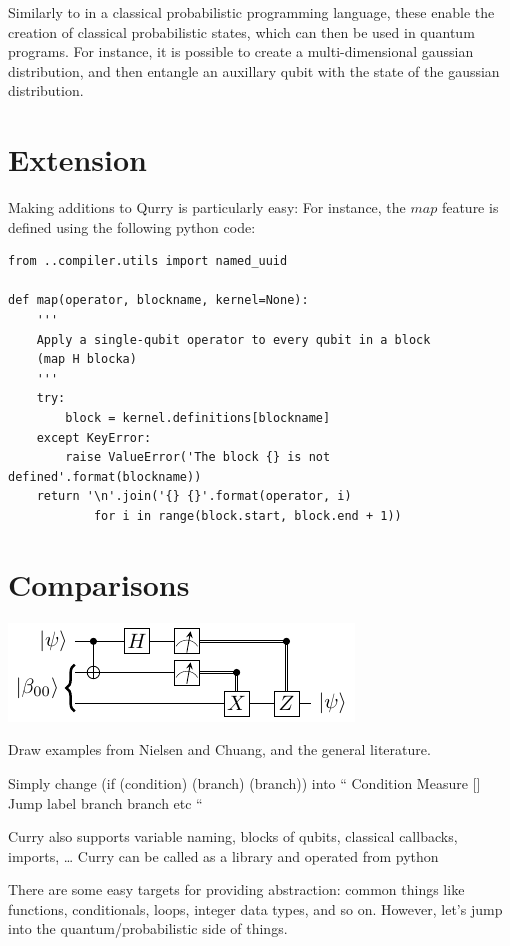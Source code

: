 \documentclass[journal]{IEEEtran}
\begin{document}
    Similarly to in a classical probabilistic programming language, these enable the creation of classical probabilistic states, which can then be used in quantum programs.
    For instance, it is possible to create a multi-dimensional gaussian distribution, and then entangle an auxillary qubit with the state of the gaussian distribution.

    \section{Extension}

    Making additions to Qurry is particularly easy:
    For instance, the $map$ feature is defined using the following python code:

    \begin{verbatim}
from ..compiler.utils import named_uuid

def map(operator, blockname, kernel=None):
    '''
    Apply a single-qubit operator to every qubit in a block
    (map H blocka)
    '''
    try:
        block = kernel.definitions[blockname]
    except KeyError:
        raise ValueError('The block {} is not defined'.format(blockname))
    return '\n'.join('{} {}'.format(operator, i)
            for i in range(block.start, block.end + 1))
    \end{verbatim}

\section{Comparisons}

\includegraphics{teleport.pdf}

    Draw examples from Nielsen and Chuang, and the general literature.

 Simply change (if (condition) (branch) (branch))
 into
 ``
 Condition
 Measure []
 Jump label
 branch
 branch etc
 ``
 
 Curry also supports variable naming, blocks of qubits, classical callbacks, imports, \dots
 Curry can be called as a library and operated from python
 
 There are some easy targets for providing abstraction: common things like functions, conditionals, loops, integer data types, and so on. 
 However, let's jump into the quantum/probabilistic side of things.
 
\end{document}
